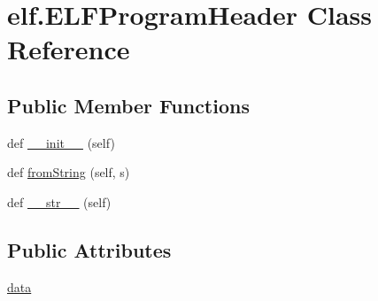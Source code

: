 \hypertarget{clasself_1_1_e_l_f_program_header}{}\section{elf.\+E\+L\+F\+Program\+Header Class Reference}
\label{clasself_1_1_e_l_f_program_header}
\subsection*{Public Member Functions}
\begin{DoxyCompactItemize}
\item 
def \hyperlink{clasself_1_1_e_l_f_program_header_a8710a32a9021284acdc813ac7ab3e682}{\+\_\+\+\_\+init\+\_\+\+\_\+} (self)
\item 
def \hyperlink{clasself_1_1_e_l_f_program_header_a3aa9a56e971beaa025f343da6573955a}{from\+String} (self, s)
\item 
def \hyperlink{clasself_1_1_e_l_f_program_header_a09f583822241ad189572fd57aaaa4107}{\+\_\+\+\_\+str\+\_\+\+\_\+} (self)
\end{DoxyCompactItemize}
\subsection*{Public Attributes}
\begin{DoxyCompactItemize}
\item 
\hyperlink{clasself_1_1_e_l_f_program_header_a2efac8c793f9509550d82916c3056f7e}{data}
\end{DoxyCompactItemize}
